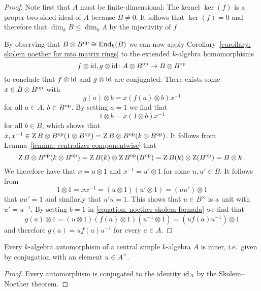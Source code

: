 \begin{proof}
  Note first that $A$ must be finite-dimensional:
  The kernel $\ker(f)$ is a proper two-sided ideal of $A$ because $B \neq 0$.
  It follows that $\ker(f) = 0$ and therefore that $\dim_k B \leq \dim_k A$ by the injectivity of $f$
  
  By observing that $B \otimes B^{\mathrm{op}} \cong \operatorname{End}_k(B)$ we can now apply Corollary~\ref{corollary: skolem noether for into matrix rings} to the extended $k$-algebra homomorphisms
  \[
            f \otimes \operatorname{id}, g \otimes \operatorname{id}
    \colon  A \otimes B^{\mathrm{op}}
    \to     B \otimes B^{\mathrm{op}}
  \]
  to conclude that $f \otimes \operatorname{id}$ and $g \otimes \operatorname{id}$ are conjugated:
  There exists some $x \in B \otimes B^{\mathrm{op}}$ with
  \begin{equation}
    \label{equation: noether skolem formula}
      g(a) \otimes b
    = x ( f(a) \otimes b ) x^{-1}
  \end{equation}
  for all $a \in A$, $b \in B^{\mathrm{op}}$.
  By setting $a = 1$ we find that
  \[
      1 \otimes b
    = x (1 \otimes b) x^{-1}
  \]
  for all $b \in B$, which shows that $x, x^{-1} \in \operatorname{Z}{B \otimes B^{\mathrm{op}}}(1 \otimes B^{\mathrm{op}}) = \operatorname{Z}{B \otimes B^{\mathrm{op}}}(k \otimes B^{\mathrm{op}})$.
  It follows from Lemma~\ref{lemma: centralizer componentwise} that
  \[
      \operatorname{Z}{B \otimes B^{\mathrm{op}}}(k \otimes B^{\mathrm{op}})
    = \operatorname{Z}{B}(k) \otimes \operatorname{Z}{B^{\mathrm{op}}}(B^{\mathrm{op}})
    = \operatorname{Z}{B}(k) \otimes \operatorname{Z}(B^{\mathrm{op}})
    = B \otimes k \,.
  \]
  We therefore have that $x = u \otimes 1$ and $x^{-1} = u' \otimes 1$ for some $u, u' \in B$.
  It follows from
  \[
      1 \otimes 1
    = x x^{-1}
    = (u \otimes 1) (u' \otimes 1)
    = (u u') \otimes 1
  \]
  that $u u' = 1$ and similarly that $u' u = 1$.
  This shows that $u \in B^\times$ is a unit with $u' = u^{-1}$.
  By setting $b = 1$ in \eqref{equation: noether skolem formula} we find that
  \[
      g(a) \otimes 1
    = (u \otimes 1) (f(a) \otimes 1) (u^{-1} \otimes 1)
    = (u f(a) u^{-1}) \otimes 1
  \]
  and therefore $g(a) = u f(a) u^{-1}$ for every $a \in A$.
\end{proof}


\begin{corollary}
  Every $k$-algebra automorphism of a central simple $k$-algebra $A$ is inner, i.e.\ given by conjugation with an element $u \in A^\times$.
\end{corollary}


\begin{proof}
  Every automorphism is conjugated to the identity $\operatorname{id}_A$ by the Skolem--Noether theorem.
\end{proof}




